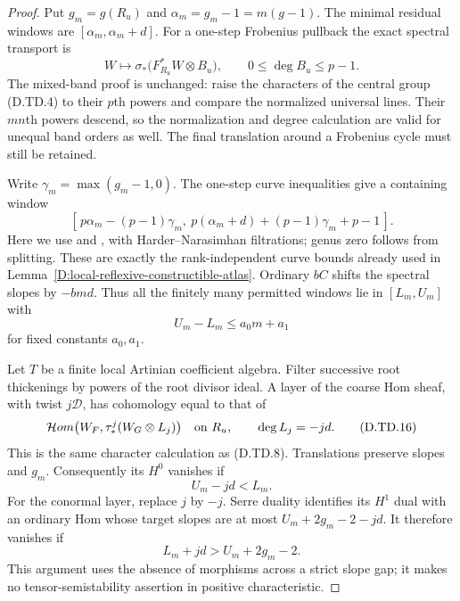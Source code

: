 \begin{proof}
Put $g_m=g(R_u)$ and $\alpha_m=g_m-1=m(g-1)$.
The minimal residual windows are $[\alpha_m,\alpha_m+d]$.
For a one-step Frobenius pullback the exact spectral transport is
\[
                 W\longmapsto\sigma_*\bigl(F_{R_u}^*W\otimes B_u\bigr),
                       \qquad 0\leq\deg B_u\leq p-1.
                                                               \tag{D.TD.13}
\]
The mixed-band proof is unchanged: raise the characters of the
central group (D.TD.4) to their $p$th powers and compare the
normalized universal lines. Their $mn$th powers descend, so the
normalization and degree calculation are valid for unequal band
orders as well. The final translation around a Frobenius cycle
must still be retained.

Write $\gamma_m=\max(g_m-1,0)$. The one-step curve inequalities
give a containing window
\[
 [\,p\alpha_m-(p-1)\gamma_m,
    \ p(\alpha_m+d)+(p-1)\gamma_m+p-1\,].                     \tag{D.TD.14}
\]
Here we use \citet[Theorem 2.2 and proof]{C_Sun2008} and
\citet[Proposition 1.3 and proof]{C_MehtaPauly2007}, with
Harder--Narasimhan filtrations; genus zero follows from splitting.
These are exactly the rank-independent curve bounds already used
in Lemma~\ref{D:local-reflexive-constructible-atlas}.
Ordinary $bC$ shifts the spectral slopes by $-bmd$.
Thus all the finitely many permitted windows lie in
$[L_m,U_m]$ with
\[
                   U_m-L_m\leq a_0m+a_1                    \tag{D.TD.15}
\]
for fixed constants $a_0,a_1$.

Let $T$ be a finite local Artinian coefficient algebra. Filter
successive root thickenings by powers of the root divisor ideal.
A layer of the coarse Hom sheaf, with twist $j\mathcal D$, has
cohomology equal to that of
\[
              \mathcal Hom\bigl(W_F,\tau^j_*(W_G\otimes L_j)\bigr)
                  \quad\hbox{on }R_u,\qquad \deg L_j=-jd.
                                                               \tag{D.TD.16}
\]
This is the same character calculation as (D.TD.8).
Translations preserve slopes and $g_m$. Consequently its $H^0$
vanishes if
\[
                       U_m-jd<L_m.                         \tag{D.TD.17}
\]
For the conormal layer, replace $j$ by $-j$.
Serre duality identifies its $H^1$ dual with an ordinary Hom
whose target slopes are at most $U_m+2g_m-2-jd$.
It therefore vanishes if
\[
                         L_m+jd>U_m+2g_m-2.                 \tag{D.TD.18}
\]
This argument uses the absence of morphisms across a strict
slope gap; it makes no tensor-semistability assertion in positive
characteristic.


\end{proof}
